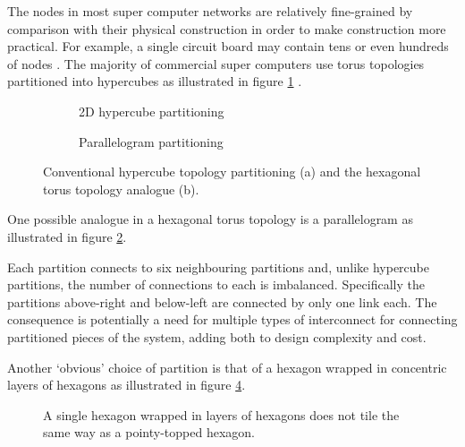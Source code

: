 			The nodes in most super computer networks are relatively fine-grained by
			comparison with their physical construction in order to make construction
			more practical. For example, a single circuit board may contain tens or
			even hundreds of nodes \cite{gilge14,ajima12}. The majority of commercial
			super computers use torus topologies partitioned into hypercubes as
			illustrated in figure \ref{fig:hypercube-partitioning}
			\cite{chen11,ajima12}.
			
			\begin{figure}
				\center
				\begin{subfigure}[b]{0.45\textwidth}
					\center
					\caption{2D hypercube partitioning}
					\label{fig:hypercube-partitioning}
				\end{subfigure}
				\begin{subfigure}[b]{0.45\textwidth}
					\center
					\caption{Parallelogram partitioning}
					\label{fig:parallelogram-partitioning}
				\end{subfigure}
				
				\caption{Conventional hypercube topology partitioning (a) and the
				hexagonal torus topology analogue (b).}
				\label{fig:partitioning-options}
			\end{figure}
			
			One possible analogue in a hexagonal torus topology is a parallelogram as
			illustrated in figure \ref{fig:parallelogram-partitioning}.
			
			Each partition connects to six neighbouring partitions and, unlike
			hypercube partitions, the number of connections to each is imbalanced.
			Specifically the partitions above-right and below-left are connected by
			only one link each. The consequence is potentially a need for multiple
			types of interconnect for connecting partitioned pieces of the system,
			adding both to design complexity and cost.
			
			Another `obvious' choice of partition is that of a hexagon wrapped in
			concentric layers of hexagons as illustrated in figure
			\ref{fig:wrapped-hexagon-tiling}.
			
			\begin{figure}
				\center
				
				\caption{A single hexagon wrapped in layers of hexagons does not tile the
				same way as a pointy-topped hexagon.}
				\label{fig:wrapped-hexagon-tiling}
			\end{figure}
			
